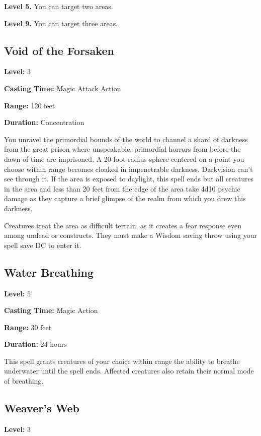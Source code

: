\documentclass[12pt,letterpaper,twocolumn,openany,nodeprecatedcode,bg=none]{dndbook}
\begin{document}
\textbf{Level 5.} You can target two areas.

\textbf{Level 9.} You can target three areas.

\subsection{Void of the Forsaken}\label{void-of-the-forsaken}

\textbf{Level:} 3

\textbf{Casting Time:} Magic Attack Action

\textbf{Range:} 120 feet

\textbf{Duration:} Concentration

You unravel the primordial bounds of the world to channel a shard of
darkness from the great prison where unspeakable, primordial horrors
from before the dawn of time are imprisoned. A 20-foot-radius sphere
centered on a point you choose within range becomes cloaked in
impenetrable darkness. Darkvision can't see through it. If the area is
exposed to daylight, this spell ends but all creatures in the area and
less than 20 feet from the edge of the area take 4d10 psychic damage as
they capture a brief glimpse of the realm from which you drew this
darkness.

Creatures treat the area as difficult terrain, as it creates a fear
response even among undead or constructs. They must make a Wisdom saving
throw using your spell save DC to enter it.

\clearpage

\subsection{Water Breathing}\label{water-breathing}

\textbf{Level:} 5

\textbf{Casting Time:} Magic Action

\textbf{Range:} 30 feet

\textbf{Duration:} 24 hours

This spell grants creatures of your choice within range the ability to
breathe underwater until the spell ends. Affected creatures also retain
their normal mode of breathing.

\subsection{Weaver's Web}\label{weavers-web}

\textbf{Level:} 3
\end{document}
